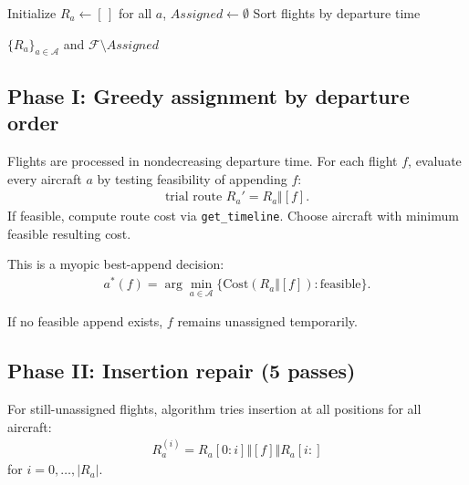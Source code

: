 \documentclass[11pt,a4paper]{article}
\begin{document}
\begin{algorithm}[h]
\caption{\texttt{optimize()}: greedy + insertion repair}
Initialize $R_a \leftarrow [\,]$ for all $a$, $Assigned \leftarrow \emptyset$\;
Sort flights by departure time\;

\Return $\{R_a\}_{a\in\mathcal{A}}$ and $\mathcal{F} \setminus Assigned$\;
\end{algorithm}

\subsection{Phase I: Greedy assignment by departure order}
Flights are processed in nondecreasing departure time.
For each flight $f$, evaluate every aircraft $a$ by testing feasibility of appending $f$:
\begin{align*}
\text{trial route } R_a' = R_a \Vert [f].
\end{align*}
If feasible, compute route cost via \texttt{get\_timeline}. Choose aircraft with minimum feasible resulting cost.

This is a myopic best-append decision:
\begin{align*}
a^*(f) = \arg\min_{a \in \mathcal{A}} \{\text{Cost}(R_a \Vert [f]) : \text{feasible}\}.
\end{align*}

If no feasible append exists, $f$ remains unassigned temporarily.

\subsection{Phase II: Insertion repair (5 passes)}
For still-unassigned flights, algorithm tries insertion at all positions for all aircraft:
\begin{align*}
R_a^{(i)} = R_a[0:i] \Vert [f] \Vert R_a[i:]
\end{align*}
for $i = 0,\dots,|R_a|$.
\end{document}
